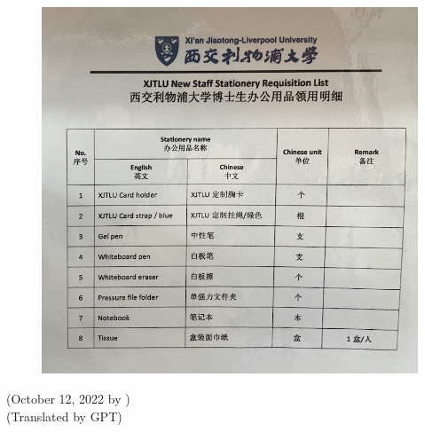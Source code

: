 \begin{figure}[H]
    \centering
    \includegraphics[width=0.6\columnwidth]{author-folder/Kai.Wu/stationery_no_sign.jpg}
\end{figure}

\begin{flushright}
(October 12, 2022 by \Wu) \\
(Translated by GPT)
\end{flushright}
